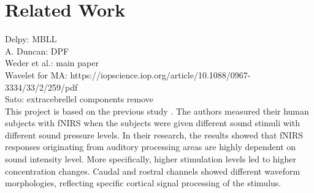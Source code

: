 \section{Related Work}
Delpy: MBLL \\
A. Duncan: DPF \\
Weder et al.: main paper \\
Wavelet for MA: https://iopscience.iop.org/article/10.1088/0967-3334/33/2/259/pdf \\
Sato: extracebrellel components remove\\ 

This project is based on the previous study \cite{Weder2018-qg}. The authors measured their human subjects with fNIRS when the subjects were given different sound stimuli with different sound pressure levels. In their research, the results showed that fNIRS responses originating from auditory processing areas are highly dependent on sound intensity level. More specifically, higher stimulation levels led to higher concentration changes. Caudal and rostral channels showed different waveform morphologies, reflecting specific cortical signal processing of the stimulus. 




